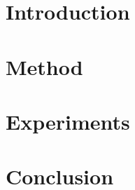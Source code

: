 \documentclass[11pt]{article}
\title{}
\author{}
\begin{document}
\maketitle

\section{Introduction}

\section{Method}

\section{Experiments}

\section{Conclusion}



\end{document}
